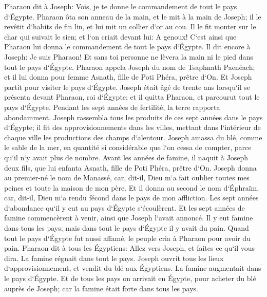\verse Pharaon dit à Joseph: Vois, je te donne le commandement de tout le pays d`Égypte. 
\verse Pharaon ôta son anneau de la main, et le mit à la main de Joseph; il le revêtit d`habits de fin lin, et lui mit un collier d`or au cou. 
\verse Il le fit monter sur le char qui suivait le sien; et l`on criait devant lui: A genoux! C`est ainsi que Pharaon lui donna le commandement de tout le pays d`Égypte. 
\verse Il dit encore à Joseph: Je suis Pharaon! Et sans toi personne ne lèvera la main ni le pied dans tout le pays d`Égypte. 
\verse Pharaon appela Joseph du nom de Tsaphnath Paenéach; et il lui donna pour femme Asnath, fille de Poti Phéra, prêtre d`On. Et Joseph partit pour visiter le pays d`Égypte. 
\verse Joseph était âgé de trente ans lorsqu`il se présenta devant Pharaon, roi d`Égypte; et il quitta Pharaon, et parcourut tout le pays d`Égypte. 
\verse Pendant les sept années de fertilité, la terre rapporta abondamment. 
\verse Joseph rassembla tous les produits de ces sept années dans le pays d`Égypte; il fit des approvisionnements dans les villes, mettant dans l`intérieur de chaque ville les productions des champs d`alentour. 
\verse Joseph amassa du blé, comme le sable de la mer, en quantité si considérable que l`on cessa de compter, parce qu`il n`y avait plus de nombre. 
\verse Avant les années de famine, il naquit à Joseph deux fils, que lui enfanta Asnath, fille de Poti Phéra, prêtre d`On. 
\verse Joseph donna au premier-né le nom de Manassé, car, dit-il, Dieu m`a fait oublier toutes mes peines et toute la maison de mon père. 
\verse Et il donna au second le nom d`Éphraïm, car, dit-il, Dieu m`a rendu fécond dans le pays de mon affliction. 
\verse Les sept années d`abondance qu`il y eut au pays d`Égypte s`écoulèrent. 
\verse Et les sept années de famine commencèrent à venir, ainsi que Joseph l`avait annoncé. Il y eut famine dans tous les pays; mais dans tout le pays d`Égypte il y avait du pain. 
\verse Quand tout le pays d`Égypte fut aussi affamé, le peuple cria à Pharaon pour avoir du pain. Pharaon dit à tous les Égyptiens: Allez vers Joseph, et faites ce qu`il vous dira. 
\verse La famine régnait dans tout le pays. Joseph ouvrit tous les lieux d`approvisionnement, et vendit du blé aux Égyptiens. La famine augmentait dans le pays d`Égypte. 
\verse Et de tous les pays on arrivait en Égypte, pour acheter du blé auprès de Joseph; car la famine était forte dans tous les pays. 


